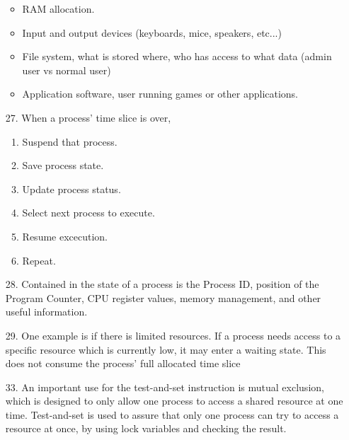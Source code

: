 \documentclass[hidelinks,12pt]{article}
\begin{document}
\begin{enumerate}
\begin{itemize}
            \item RAM allocation.
            \item Input and output devices (keyboards, mice, speakers, etc...)
            \item File system, what is stored where, who has access to what data (admin user vs normal user)
            \item Application software, user running games or other applications.
        \end{itemize}
    \item[27.] When a process' time slice is over, \begin{enumerate}
            \item Suspend that process.
            \item Save process state.
            \item Update process status.
            \item Select next process to execute.
            \item Resume excecution.
            \item Repeat.
    \end{enumerate}
    \item[28.] Contained in the state of a process is the Process ID, position of the Program Counter, CPU register values, memory management, and other useful information.
    \item[29.] One example is if there is limited resources. If a process needs access to a specific resource which is currently low, it may enter a waiting state. This does not consume the process' full allocated time slice 
    \item[33.] An important use for the test-and-set instruction is mutual exclusion, which is designed to only allow one process to access a shared resource at one time. Test-and-set is used to assure that only one process can try to access a resource at once, by using lock variables and checking the result.
\end{enumerate}
\end{document}
